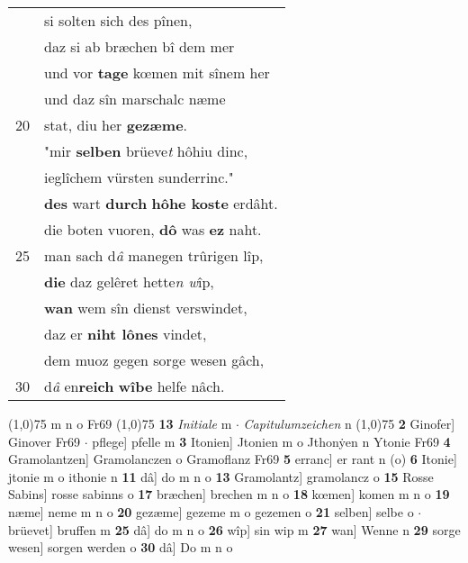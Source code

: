 \documentclass[8pt,a4paper,notitlepage]{article}
\begin{document}
\begin{table}[ht]
\begin{minipage}[t]{0.5\linewidth}
\begin{tabular}{rl}
 & si solten sich des pînen,\\ 
 & daz si ab bræchen bî dem mer\\ 
 & und vor \textbf{tage} kœmen mit sînem her\\ 
 & und daz sîn marschalc næme\\ 
20 & stat, diu her \textbf{gezæme}.\\ 
 & "mir \textbf{selben} brüeve\textit{t} hôhiu dinc,\\ 
 & ieglîchem vürsten sunderrinc."\\ 
 & \textbf{des} wart \textbf{durch} \textbf{hôhe koste} erdâht.\\ 
 & die boten vuoren, \textbf{dô} was \textbf{ez} naht.\\ 
25 & man sach d\textit{â} manegen trûrigen lîp,\\ 
 & \textbf{die} daz gelêret hette\textit{n w}îp,\\ 
 & \textbf{wan} wem sîn dienst verswindet,\\ 
 & daz er \textbf{niht lônes} vindet,\\ 
 & dem muoz gegen sorge wesen gâch,\\ 
30 & d\textit{â} en\textbf{reich} \textbf{wîbe} helfe nâch.\\ 
\end{tabular}
\scriptsize
\line(1,0){75} \newline
m n o Fr69 \newline
\line(1,0){75} \newline
\textbf{13} \textit{Initiale} m   $\cdot$ \textit{Capitulumzeichen} n  \newline
\line(1,0){75} \newline
\textbf{2} Ginofer] Ginover Fr69  $\cdot$ pflege] pfelle m \textbf{3} Itonien] Jtonien m o Jthonẏen n Ytonie Fr69 \textbf{4} Gramolantzen] Gramolanczen o Gramoflanz Fr69 \textbf{5} erranc] er rant n (o) \textbf{6} Itonie] jtonie m o ithonie n \textbf{11} dâ] do m n o \textbf{13} Gramolantz] gramolancz o \textbf{15} Rosse Sabins] rosse sabinns o \textbf{17} bræchen] brechen m n o \textbf{18} kœmen] komen m n o \textbf{19} næme] neme m n o \textbf{20} gezæme] gezeme m o gezemen o \textbf{21} selben] selbe o  $\cdot$ brüevet] bruffen m \textbf{25} dâ] do m n o \textbf{26} wîp] sin wip m \textbf{27} wan] Wenne n \textbf{29} sorge wesen] sorgen werden o \textbf{30} dâ] Do m n o \newline
\end{minipage}
\end{table}
\newpage
\end{document}
